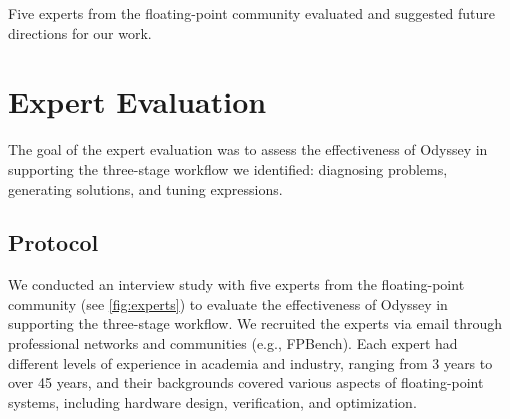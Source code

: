 \begin{table}
  \centering
  
  \caption {Five experts from the floating-point community evaluated and suggested future directions for our work.}
  \label{fig:experts}
\end{table}

\section{Expert Evaluation}
The goal of the expert evaluation
  was to assess the effectiveness of Odyssey
  in supporting the three-stage workflow we identified:
  diagnosing problems,
  generating solutions,
  and tuning expressions.

\subsection{Protocol}
We conducted an interview study
  with five experts from the floating-point community
  (see \autoref{fig:experts})
  to evaluate the effectiveness of Odyssey
  in supporting the three-stage workflow.
We recruited the experts via email
  through professional networks and communities (e.g., FPBench).
Each expert had different levels of experience
  in academia and industry,
  ranging from 3 years to over 45 years,
  and their backgrounds covered various aspects of floating-point systems,
  including hardware design, verification, and optimization.

